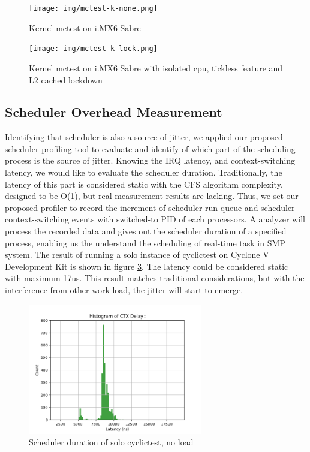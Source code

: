 \documentclass[conference]{IEEEtran}
\begin{document}
    \begin{figure} \centering \texttt{[image: img/mctest-k-none.png]} \caption{Kernel mctest on i.MX6 Sabre}
    \label{fig:imx6_mctest_k_v} \end{figure}
    
    \begin{figure} \centering \texttt{[image: img/mctest-k-lock.png]} \caption{Kernel mctest on i.MX6 Sabre
    with isolated cpu, tickless feature and L2 cached lockdown} \label{fig:imx6_mctest_k_lock} \end{figure}
    
\subsection{Scheduler Overhead Measurement}
    
    Identifying that scheduler is also a source of jitter, we applied our proposed scheduler profiling tool to evaluate
    and identify of which part of the scheduling process is the source of jitter. Knowing the IRQ latency, and
    context-switching latency, we would like to evaluate the scheduler duration. Traditionally, the latency of this part
    is considered static with the CFS algorithm complexity, designed to be O(1), but real measurement results are
    lacking. Thus, we set our proposed profiler to record the increment of scheduler run-queue and scheduler
    context-switching events with switched-to PID of each processors. A analyzer will process the recorded data and
    gives out the scheduler duration of a specified process, enabling us the understand the scheduling of real-time task
    in SMP system. The result of running a solo instance of cyclictest on Cyclone V Development Kit is shown in figure
    \ref{fig:sd_noload}. The latency could be considered static with maximum 17us. This result matches traditional
    considerations, but with the interference from other work-load, the jitter will start to emerge.

    \begin{figure} \centering \includegraphics[width=3in]{img/sd-noload.png} \caption{Scheduler duration of solo
    cyclictest, no load} \label{fig:sd_noload} \end{figure}
\end{document}
